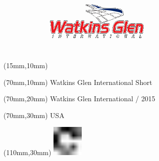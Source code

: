 \null\newpage
\begin{textblock*}{50mm}(15mm,10mm)%
\includegraphics[width=50mm]{LG/WAT.png}
\end{textblock*}
\begin{textblock*}{130mm}(70mm,10mm)%
{\fontsize{20}{20}\selectfont Watkins Glen International Short}\\
\end{textblock*}
\begin{textblock*}{120mm}(70mm,20mm)%
{\fontsize{16}{16}\selectfont Watkins Glen International / 2015}\\
\end{textblock*}
\begin{textblock*}{120mm}(70mm,30mm)%
{\fontsize{12}{12}\selectfont USA}
\end{textblock*}
\begin{textblock*}{30mm}(110mm,30mm)%
\centering
\includegraphics[height=15mm]{icons/fa-rotate-right.pdf}
\end{textblock*}
